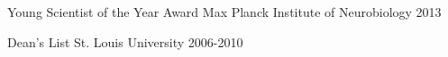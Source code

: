 



\begin{cvhonors}


\cvhonor
{Young Scientist of the Year Award} %
{Max Planck Institute of Neurobiology} %
{} %
{2013} %


\cvhonor
{Dean's List} %
{St. Louis University} %
{} %
{2006-2010} %



\end{cvhonors}